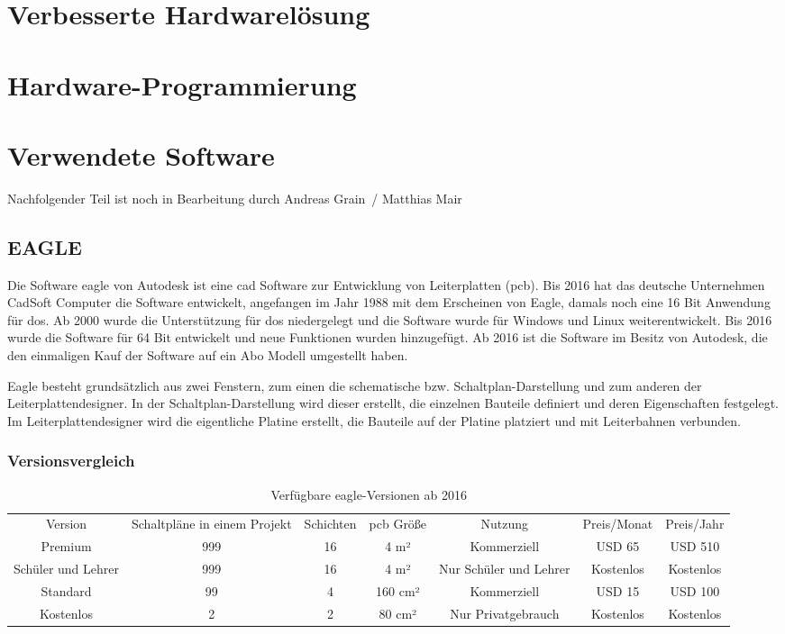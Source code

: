 \documentclass[a4paper, twoside, 12pt, openright]{memoir}
\newcommand{\AndreasGrain}{Andreas Grain}
\newcommand{\MatthiasMair}{Matthias Mair}
\newcommand{\authorName}{\AndreasGrain\ / \MatthiasMair}
\newcommand{\wip}{{\color{red}Nachfolgender Teil ist noch in Bearbeitung durch \authorName}}
\begin{document}
\chapter{Verbesserte Hardwarelösung}

\chapter{Hardware-Programmierung}

\chapter{Verwendete Software}
\wip
\section{EAGLE}
Die Software \ac{eagle} von Autodesk ist eine \ac{cad} Software zur Entwicklung von Leiterplatten (\ac{pcb}).
Bis 2016 hat das deutsche Unternehmen CadSoft Computer die Software entwickelt, angefangen im Jahr 1988 mit dem Erscheinen von Eagle, damals noch eine 16 Bit Anwendung für \ac{dos}.
Ab 2000 wurde die Unterstützung für \ac{dos} niedergelegt und die Software wurde für Windows und Linux weiterentwickelt.
Bis 2016 wurde die Software für 64 Bit entwickelt und neue Funktionen wurden hinzugefügt.
Ab 2016 ist die Software im Besitz von Autodesk, die den einmaligen Kauf der Software auf ein Abo Modell umgestellt haben.\par

Eagle besteht grundsätzlich aus zwei Fenstern, zum einen die schematische bzw. Schaltplan-Darstellung und zum anderen der Leiterplattendesigner.
In der Schaltplan-Darstellung wird dieser erstellt, die einzelnen Bauteile definiert und deren Eigenschaften festgelegt.
Im Leiterplattendesigner wird die eigentliche Platine erstellt, die Bauteile auf der Platine platziert und mit Leiterbahnen verbunden.
\subsection{Versionsvergleich}
\begin{table}
	\centering
	\begin{tabular}{|c|c|c|c|c|c|c|}
		Version&Schaltpläne in einem Projekt&Schichten&\ac{pcb} Größe&Nutzung&Preis/Monat&Preis/Jahr\\
		Premium&999&16&4 m²&Kommerziell&USD 65&USD 510\\
		Schüler und Lehrer&999&16&4 m²&Nur Schüler und Lehrer&Kostenlos&Kostenlos\\
		Standard&99&4&160 cm²&Kommerziell&USD 15&USD 100\\
		Kostenlos&2&2&80 cm²&Nur Privatgebrauch&Kostenlos&Kostenlos
	\end{tabular}
	\caption{Verfügbare \ac{eagle}-Versionen ab 2016}
\end{table}
\end{document}
